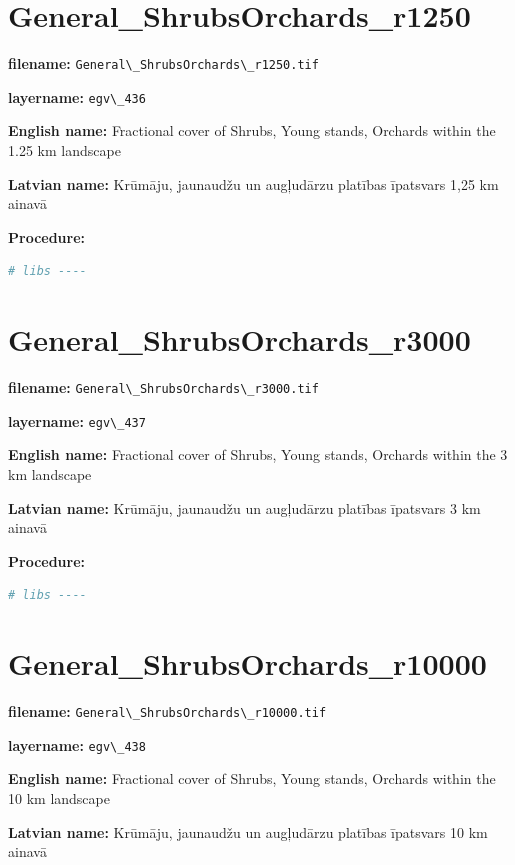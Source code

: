 \documentclass[
]{book}
\newcommand{\passthrough}[1]{#1}
\begin{document}
\section{General\_ShrubsOrchards\_r1250}\label{ch06.436}

\textbf{filename:} \passthrough{\lstinline!General\_ShrubsOrchards\_r1250.tif!}

\textbf{layername:} \passthrough{\lstinline!egv\_436!}

\textbf{English name:} Fractional cover of Shrubs, Young stands, Orchards within the 1.25 km landscape

\textbf{Latvian name:} Krūmāju, jaunaudžu un augļudārzu platības īpatsvars 1,25 km ainavā

\textbf{Procedure:}

\begin{lstlisting}[language=R]
# libs ----
\end{lstlisting}

\section{General\_ShrubsOrchards\_r3000}\label{ch06.437}

\textbf{filename:} \passthrough{\lstinline!General\_ShrubsOrchards\_r3000.tif!}

\textbf{layername:} \passthrough{\lstinline!egv\_437!}

\textbf{English name:} Fractional cover of Shrubs, Young stands, Orchards within the 3 km landscape

\textbf{Latvian name:} Krūmāju, jaunaudžu un augļudārzu platības īpatsvars 3 km ainavā

\textbf{Procedure:}

\begin{lstlisting}[language=R]
# libs ----
\end{lstlisting}

\section{General\_ShrubsOrchards\_r10000}\label{ch06.438}

\textbf{filename:} \passthrough{\lstinline!General\_ShrubsOrchards\_r10000.tif!}

\textbf{layername:} \passthrough{\lstinline!egv\_438!}

\textbf{English name:} Fractional cover of Shrubs, Young stands, Orchards within the 10 km landscape

\textbf{Latvian name:} Krūmāju, jaunaudžu un augļudārzu platības īpatsvars 10 km ainavā
\end{document}
